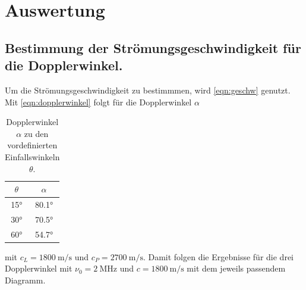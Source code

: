 \documentclass[
  bibliography=totoc,     %
  captions=tableheading,  %
  titlepage=firstiscover, %
]{scrartcl}
\begin{document}
\section{Auswertung}
\subsection{Bestimmung der Strömungsgeschwindigkeit für die Dopplerwinkel.}
Um die Strömungsgeschwindigkeit zu bestimmmen, wird \eqref{eqn:geschw} genutzt.
Mit \eqref{eqn:dopplerwinkel} folgt für die Dopplerwinkel $\alpha$
\begin{table}
  \centering
  \begin{tabular}{c c}
    \toprule
    {$\theta$} & {$\alpha$} \\
    \midrule
    15° & 80.1° \\
    30° & 70.5° \\
    60° & 54.7° \\
    \bottomrule
  \end{tabular}
  \caption{Dopplerwinkel $\alpha$ zu den vordefinierten Einfallswinkeln
  $\theta$.}
  \label{tab:1}
\end{table}
mit $c_L = \SI{1800}{\meter\per\second}$ und $c_P =
\SI{2700}{\meter\per\second}$.
Damit folgen die Ergebnisse für die drei Dopplerwinkel mit $\nu_0 =
\SI{2}{\mega\hertz}$
und $c = \SI{1800}{\meter\per\second}$ mit dem jeweils passendem Diagramm.
\end{document}
